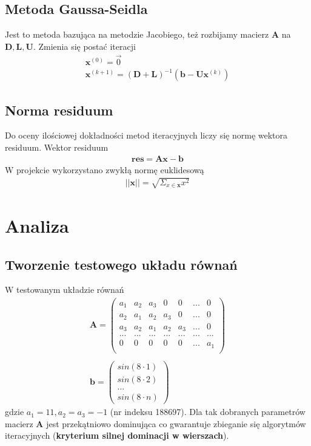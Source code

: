 \documentclass{article}
\begin{document}
\subsection*{Metoda Gaussa-Seidla}
Jest to metoda bazująca na metodzie Jacobiego, też rozbijamy macierz $\boldsymbol{A}$ na 
$\boldsymbol{D}, \boldsymbol{L}, \boldsymbol{U}$. Zmienia się postać iteracji
\begin{gather*}
	\boldsymbol{x}^{(0)} = \vec{0} \\
	\boldsymbol{x}^{(k+1)} = (\boldsymbol{D} + \boldsymbol{L})^{-1}
(\boldsymbol{b} - \boldsymbol{U}\boldsymbol{x}^{(k)})
\end{gather*}

\subsection*{Norma residuum}
Do oceny ilościowej dokładności metod iteracyjnych liczy się normę wektora residuum.
Wektor residuum
\begin{gather*}
	\boldsymbol{res} = \boldsymbol{A}\boldsymbol{x} - \boldsymbol{b}
\end{gather*}
W projekcie wykorzystano zwykłą normę euklidesową
\begin{gather*}
	||\boldsymbol{x}|| = \sqrt{\Sigma_{x \in \boldsymbol{x}} x^2}
\end{gather*}
\section{Analiza}
\subsection{Tworzenie testowego układu równań}
W testowanym układzie równań
\begin{gather*}
	\boldsymbol{A} = \begin{pmatrix}
		a_1 & a_2 & a_3 & 0 & 0 & ...  & 0\\
		a_2 & a_1 & a_2 & a_3 & 0 & ...  & 0\\
		a_3 & a_2 & a_1 & a_2 & a_3 & ...  & 0\\
		...     & ...     &  ...    & ...     & ...     & ...  & ...\\
		0 & 0 & 0 & 0 & 0 & ...  & a_1\\
	\end{pmatrix} \\\\
	\boldsymbol{b} = \begin{pmatrix}
		sin(8 \cdot 1) \\
		sin(8 \cdot 2) \\
		... \\
		sin(8 \cdot n)
	\end{pmatrix}
\end{gather*}
gdzie $a_1=11, a_2 = a_3 = -1$ (nr indeksu 188697).
Dla tak dobranych parametrów macierz $\boldsymbol{A}$ jest przekątniowo dominująca
co gwarantuje zbieganie się algorytmów iteracyjnych (\textbf{kryterium silnej dominacji w wierszach}).
\end{document}
